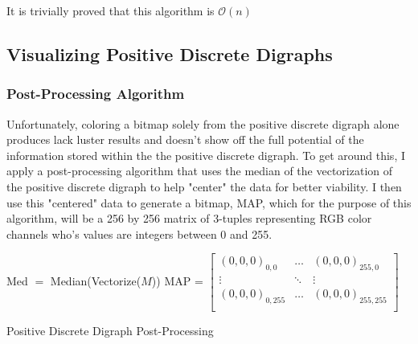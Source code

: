 \documentclass[12pt,a4paper]{article}
\begin{document}
It is trivially proved that this algorithm is $\mathcal{O}(n)$ 
\subsection{Visualizing Positive Discrete Digraphs}
\subsubsection{Post-Processing Algorithm}
Unfortunately, coloring a bitmap solely from the positive discrete digraph alone produces lack luster results and doesn't show off the full potential of the information stored within the the positive discrete digraph. To get around this, I apply a post-processing algorithm that uses the median of the vectorization of the positive discrete digraph to help "center" the data for better viability. I then use this "centered" data to generate a bitmap, MAP, which for the purpose of this algorithm, will be a 256 by 256 matrix of 3-tuples representing RGB color channels who's values are integers between 0 and 255. 

\begin{algorithm}
\DontPrintSemicolon
{}
\BlankLine
Med $=$ Median(Vectorize($M$))\;
MAP = $\begin{bmatrix}(0,0,0)_{0,0} & \ldots & (0,0,0)_{255,0}\\\vdots &\ddots&\vdots\\(0,0,0)_{0,255} & \ldots & (0,0,0)_{255,255}\\\end{bmatrix}$\;
\caption{Positive Discrete Digraph Post-Processing}
\end{algorithm}
\end{document}
